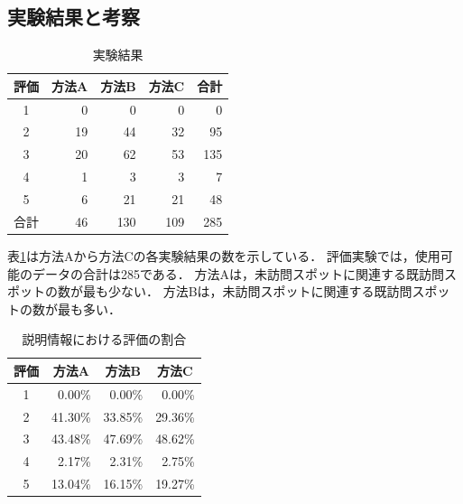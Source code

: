 \documentclass{deimj}
\begin{document}
\subsection{実験結果と考察}
\label{subsec:実験結果と考察}

\begin{table}[t]
  \caption{実験結果}
  \label{table:実験結果}
  \centering
  \begin{tabular}{c|r|r|r|r}
  \hline
  評価 & \multicolumn{1}{c|}{方法A} & \multicolumn{1}{c|}{方法B} & \multicolumn{1}{c|}{方法C} &  \multicolumn{1}{c}{合計} \\ \hline
  1  & 0                      & 0                      & 0                       & 0                      \\
  2  & 19                     & 44                     & 32                     & 95                    \\
  3  & 20                     & 62                     & 53                      & 135                    \\
  4  & 1                      & 3                      & 3                      & 7                     \\
  5  & 6                      & 21                     & 21                     & 48                     \\\hline
  合計 & 46                     & 130                    & 109                    & 285                    \\ \hline
  \end{tabular}
\end{table}

表\ref{table:実験結果}は方法Aから方法Cの各実験結果の数を示している．
評価実験では，使用可能のデータの合計は285である．
方法Aは，未訪問スポットに関連する既訪問スポットの数が最も少ない．
方法Bは，未訪問スポットに関連する既訪問スポットの数が最も多い．

\begin{table}[t]
  \caption{説明情報における評価の割合}
  \label{table:説明情報における評価の割合}
  \centering
  \begin{tabular}{c|r|r|r}
  \hline
  評価 & \multicolumn{1}{c|}{方法A} & \multicolumn{1}{c|}{方法B} & \multicolumn{1}{c}{方法C} \\ \hline
  1  & 0.00\%                     & 0.00\%                     & 0.00\% \\
  2  & 41.30\%                    & 33.85\%                    & 29.36\% \\
  3  & 43.48\%                    & 47.69\%                    & 48.62\% \\
  4  & 2.17\%                     & 2.31\%                     & 2.75\% \\
  5  & 13.04\%                    & 16.15\%                    & 19.27\% \\ \hline
  \end{tabular}
\end{table}
\end{document}
